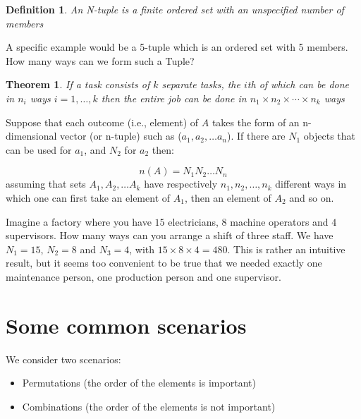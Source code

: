 \documentclass[12pt]{extbook}
\newtheorem{df}{Definition}[section]
\newtheorem{tm}{Theorem}[section]
\begin{document}
\begin{df}
An N-tuple is a finite ordered set with an unspecified number of members
\end{df}

A specific example would be a 5-tuple which is an ordered set with 5 members.   How many ways can we form such a Tuple?

\begin{tm}
If a task consists of $k$ separate tasks, the $i$th of which can be done in $n_i$ ways $i=1,\ldots,k$ then the entire job can be done in $n_1 \times n_2 \times \cdots \times n_k$ ways
\end{tm}



Suppose that each outcome (i.e., element) of $A$ takes the form of an n-dimensional vector (or n-tuple) such as ($a_1, a_2, \ldots a_n$).   If there are $N_1$ objects that can be used for $a_1$, and $N_2$ for $a_2$ then:

\begin{equation}
n(A) = N_1N_2 \ldots N_n   
\end{equation}
assuming that sets $A_1, A_2, \ldots A_k$ have respectively $n_1, n_2, \ldots, n_k$ different ways in which one can first take an element of $A_1$, then an element of $A_2$ and so on.


Imagine a factory where you have $15$ electricians, $8$ machine operators and $4$ supervisors.   How many ways can you arrange a shift of three staff.  We have $N_1 = 15$, $N_2=8$ and $N_3=4$, with $15 \times 8 \times 4 = 480$.  This is rather an intuitive result, but it seems too convenient to be true that we needed exactly one maintenance person, one production person and one supervisor.   




\section{Some common scenarios}

We consider two scenarios:
\begin{itemize}
\item Permutations (the order of the elements is important)
\item Combinations (the order of the elements is not important)
\end{itemize}
\end{document}
